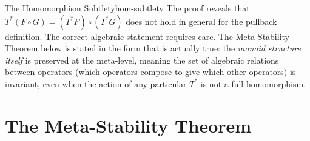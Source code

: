 \documentclass[12pt,twoside,openright]{book}
\begin{document}
\begin{remark}{The Homomorphism Subtlety}{hom-subtlety}
The proof reveals that $T^*(F\circ G)=(T^*F)\circ(T^*G)$
does not hold in general for the pullback definition. The
correct algebraic statement requires care. The Meta-Stability
Theorem below is stated in the form that is actually true: the
\emph{monoid structure itself} is preserved at the meta-level,
meaning the set of algebraic relations between operators
(which operators compose to give which other operators) is
invariant, even when the action of any particular $T^*$ is
not a full homomorphism.
\end{remark}

\section{The Meta-Stability Theorem}
\end{document}
